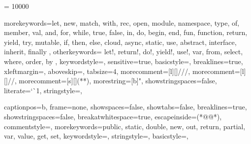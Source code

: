 
\usepackage[utf8]{inputenc}
\usepackage[english]{babel}
\usepackage{parskip}
\usepackage{tablefootnote}
\usepackage{amssymb}
\usepackage{mathrsfs}
\usepackage{mathtools} 
\usepackage{wrapfig} 
\usepackage{geometry}
 \geometry{
 a4paper,
 right=40mm,
 left=40mm,
 top=40mm,
 bottom=40mm
 }

\usepackage[nottoc]{tocbibind}
\usepackage[titles]{tocloft}

\usepackage[
backend=biber,
style=numeric,
maxbibnames=9
]{biblatex}


\interlinepenalty = 10000

\usepackage{csquotes}

\usepackage{float}
\usepackage{graphicx}
\usepackage{epstopdf}
\usepackage{amsmath}
\usepackage{dsfont}
\usepackage{bm}

\usepackage{tikz}

\usepackage{marvosym}


\usepackage{amsmath}

\usepackage{multicol}

\usepackage{siunitx}

\usepackage[
hidelinks %
]{hyperref}

\usepackage{mdframed}

\usepackage{listings}
\usepackage{upquote}
 
 \usepackage{color}
 
%
{morekeywords={let, new, match, with, rec, open, module, namespace, type, of, member, val, %
and, for, while, true, false, in, do, begin, end, fun, function, return, yield, try, %
mutable, if, then, else, cloud, async, static, use, abstract, interface, inherit, finally },
  otherkeywords={ let!, return!, do!, yield!, use!, var, from, select, where, order, by },
  keywordstyle=\color{bluekeywords},
  sensitive=true,
  basicstyle=\ttfamily,
	breaklines=true,
  xleftmargin=\parindent,
  aboveskip=\bigskipamount,
	tabsize=4,
  morecomment=[l][\color{greencomments}]{///},
  morecomment=[l][\color{greencomments}]{//},
  morecomment=[s][\color{greencomments}]{{(*}{*)}},
  morestring=[b]",
  showstringspaces=false,
  literate={`}{\`}1,
  stringstyle=\color{redstrings},
}


{
captionpos=b,
frame=none, %
showspaces=false,
showtabs=false,
breaklines=true,
showstringspaces=false,
breakatwhitespace=true,
escapeinside={(*@}{@*)},
commentstyle=\color{greencomments},
morekeywords={public, static, double, new, out, return, partial, var, value, get, set},
keywordstyle=\color{bluekeywords},
stringstyle=\color{redstrings},
basicstyle=\ttfamily\small,
}


